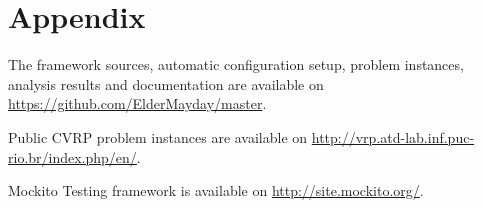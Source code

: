 \documentclass[12pt,a4paper,oneside]{book}
\begin{document}




\chapter{Appendix}

The framework sources, automatic configuration setup, problem instances, analysis results and documentation are available on \url{https://github.com/ElderMayday/master}.

Public CVRP problem instances are available on \url{http://vrp.atd-lab.inf.puc-rio.br/index.php/en/}.

Mockito Testing framework is available on \url{http://site.mockito.org/}.
\end{document}
